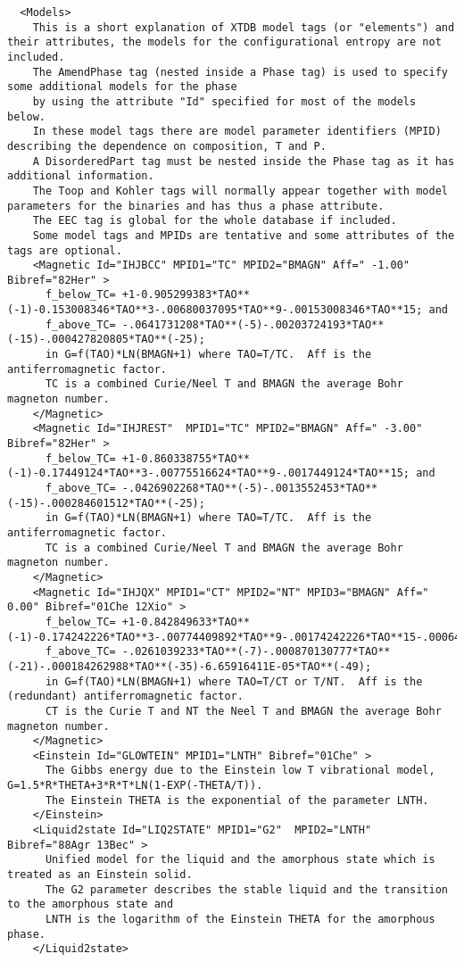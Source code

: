 \documentclass{article}
\begin{document}
\begin{appendices}
{\small
\begin{verbatim}
  <Models>
    This is a short explanation of XTDB model tags (or "elements") and their attributes, the models for the configurational entropy are not included.
    The AmendPhase tag (nested inside a Phase tag) is used to specify some additional models for the phase
    by using the attribute "Id" specified for most of the models below.
    In these model tags there are model parameter identifiers (MPID) describing the dependence on composition, T and P.
    A DisorderedPart tag must be nested inside the Phase tag as it has additional information.
    The Toop and Kohler tags will normally appear together with model parameters for the binaries and has thus a phase attribute.
    The EEC tag is global for the whole database if included.
    Some model tags and MPIDs are tentative and some attributes of the tags are optional.
    <Magnetic Id="IHJBCC" MPID1="TC" MPID2="BMAGN" Aff=" -1.00" Bibref="82Her" > 
      f_below_TC= +1-0.905299383*TAO**(-1)-0.153008346*TAO**3-.00680037095*TAO**9-.00153008346*TAO**15; and
      f_above_TC= -.0641731208*TAO**(-5)-.00203724193*TAO**(-15)-.000427820805*TAO**(-25); 
      in G=f(TAO)*LN(BMAGN+1) where TAO=T/TC.  Aff is the antiferromagnetic factor.
      TC is a combined Curie/Neel T and BMAGN the average Bohr magneton number.
    </Magnetic>
    <Magnetic Id="IHJREST"  MPID1="TC" MPID2="BMAGN" Aff=" -3.00" Bibref="82Her" > 
      f_below_TC= +1-0.860338755*TAO**(-1)-0.17449124*TAO**3-.00775516624*TAO**9-.0017449124*TAO**15; and 
      f_above_TC= -.0426902268*TAO**(-5)-.0013552453*TAO**(-15)-.000284601512*TAO**(-25); 
      in G=f(TAO)*LN(BMAGN+1) where TAO=T/TC.  Aff is the antiferromagnetic factor.
      TC is a combined Curie/Neel T and BMAGN the average Bohr magneton number.
    </Magnetic>
    <Magnetic Id="IHJQX" MPID1="CT" MPID2="NT" MPID3="BMAGN" Aff=" 0.00" Bibref="01Che 12Xio" > 
      f_below_TC= +1-0.842849633*TAO**(-1)-0.174242226*TAO**3-.00774409892*TAO**9-.00174242226*TAO**15-.000646538871*TAO**21;
      f_above_TC= -.0261039233*TAO**(-7)-.000870130777*TAO**(-21)-.000184262988*TAO**(-35)-6.65916411E-05*TAO**(-49);
      in G=f(TAO)*LN(BMAGN+1) where TAO=T/CT or T/NT.  Aff is the (redundant) antiferromagnetic factor.
      CT is the Curie T and NT the Neel T and BMAGN the average Bohr magneton number.
    </Magnetic>
    <Einstein Id="GLOWTEIN" MPID1="LNTH" Bibref="01Che" > 
      The Gibbs energy due to the Einstein low T vibrational model, G=1.5*R*THETA+3*R*T*LN(1-EXP(-THETA/T)).
      The Einstein THETA is the exponential of the parameter LNTH.
    </Einstein>
    <Liquid2state Id="LIQ2STATE" MPID1="G2"  MPID2="LNTH" Bibref="88Agr 13Bec" > 
      Unified model for the liquid and the amorphous state which is treated as an Einstein solid.
      The G2 parameter describes the stable liquid and the transition to the amorphous state and
      LNTH is the logarithm of the Einstein THETA for the amorphous phase.
    </Liquid2state>
\end{verbatim}
}


\end{appendices}
\end{document}
